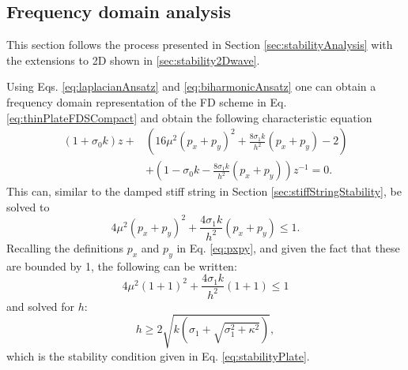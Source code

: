 {\subsection{Frequency domain analysis}\label{sec:stabilityThinPlate}
This section follows the process presented in Section \ref{sec:stabilityAnalysis} with the extensions to 2D shown in \ref{sec:stability2Dwave}.

Using Eqs. \eqref{eq:laplacianAnsatz} and \eqref{eq:biharmonicAnsatz} one can obtain a frequency domain representation of the FD scheme in Eq. \eqref{eq:thinPlateFDSCompact}
and obtain the following characteristic equation
\begin{equation}
    \begin{aligned}
        (1+\sigma_0k)z + &\left(16\mu^2(p_x+p_y)^2 + \frac{8\sigma_1k}{h^2}(p_x+p_y) - 2\right) \\
        &+ \left(1 - \sigma_0k - \frac{8\sigma_1k}{h^2}(p_x+p_y)\right)z^{-1} = 0.
    \end{aligned}
\end{equation}
This can, similar to the damped stiff string in Section \ref{sec:stiffStringStability}, be solved to
\begin{equation*}
    4\mu^2(p_x+p_y)^2 + \frac{4\sigma_1k}{h^2}(p_x+p_y) \leq 1.
\end{equation*}
Recalling the definitions $p_x$ and $p_y$ in Eq. \eqref{eq:pxpy}, and given the fact that these are bounded by 1, the following can be written:
\begin{equation*}
    4\mu^2(1+1)^2 + \frac{4\sigma_1k}{h^2}(1+1) \leq 1
\end{equation*}
and solved for $h$:
\begin{equation}
    h \geq 2\sqrt{k\left(\sigma_1 + \sqrt{\sigma_1^2 + \kappa^2}\right)},
\end{equation}
which is the stability condition given in Eq. \eqref{eq:stabilityPlate}.

}
